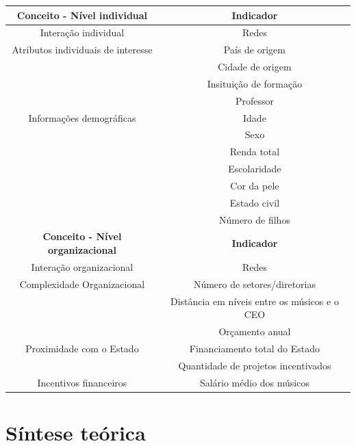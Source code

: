 \documentclass[a4paper, 12pt, openright, oneside, german, french, english, brazil]{abntex2}
\begin{document}
	
	\begin{table}[!ht]
		{\begin{tabular}{|c|c|}
				
				\hline
				\textbf{Conceito - Nível individual} & \textbf{Indicador} \\
				\hline
				Interação individual & Redes \\
				\hline
				Atributos individuais de interesse & País de origem  \\
				& Cidade de origem  \\
				& Insituição de formação \\
				& Professor    \\
				\hline
				Informações demográficas & Idade \\
				& Sexo \\
				& Renda total \\
				& Escolaridade \\
				& Cor da pele \\
				& Estado civil \\
				& Número de filhos \\
				\hline
				\textbf{Conceito - Nível organizacional} & \textbf{Indicador} \\
				\hline
				Interação organizacional & Redes \\
				\hline
				
				Complexidade Organizacional  & Número de setores/diretorias  \\
				& Distância em níveis entre os músicos e o CEO \\
				& Orçamento anual \\
				\hline
				Proximidade com o Estado & Financiamento total do Estado \\
				& Quantidade de projetos incentivados \\
				\hline
				Incentivos financeiros & Salário médio dos músicos \\
				\hline
				
			\end{tabular}
		}
		{}
	\end{table}
	
	



	\section{Síntese teórica}
\end{document}
